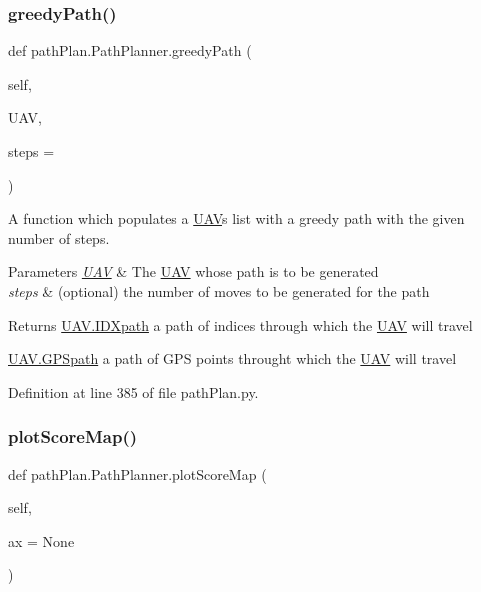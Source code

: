\subsubsection{\texorpdfstring{greedy\+Path()}{greedyPath()}}
{\footnotesize\ttfamily def path\+Plan.\+Path\+Planner.\+greedy\+Path (\begin{DoxyParamCaption}\item[{}]{self,  }\item[{}]{U\+AV,  }\item[{}]{steps = {} }\end{DoxyParamCaption})}



A function which populates a \mbox{\hyperlink{classpath_plan_1_1_u_a_v}{U\+AV}}\textquotesingle{}s list with a greedy path with the given number of steps. 


\begin{DoxyParams}{Parameters}
{\em \mbox{\hyperlink{classpath_plan_1_1_u_a_v}{U\+AV}}} & The \mbox{\hyperlink{classpath_plan_1_1_u_a_v}{U\+AV}} whose path is to be generated \\
\hline
{\em steps} & (optional) the number of moves to be generated for the path \\
\hline
\end{DoxyParams}
\begin{DoxyReturn}{Returns}
\mbox{\hyperlink{classpath_plan_1_1_u_a_v_a640c0f9f8385d53e0742d9ef5f3a7a59}{U\+A\+V.\+I\+D\+Xpath}} a path of indices through which the \mbox{\hyperlink{classpath_plan_1_1_u_a_v}{U\+AV}} will travel 

\mbox{\hyperlink{classpath_plan_1_1_u_a_v_a1d6d4797e8ac522de0da65ba882b8616}{U\+A\+V.\+G\+P\+Spath}} a path of G\+PS points throught which the \mbox{\hyperlink{classpath_plan_1_1_u_a_v}{U\+AV}} will travel 
\end{DoxyReturn}


Definition at line 385 of file path\+Plan.\+py.

\mbox{\label{classpath_plan_1_1_path_planner_abe0f6150b91e41dc9625d29a7005e37d}} 
\subsubsection{\texorpdfstring{plot\+Score\+Map()}{plotScoreMap()}}
{\footnotesize\ttfamily def path\+Plan.\+Path\+Planner.\+plot\+Score\+Map (\begin{DoxyParamCaption}\item[{}]{self,  }\item[{}]{ax = {\ttfamily None} }\end{DoxyParamCaption})}



